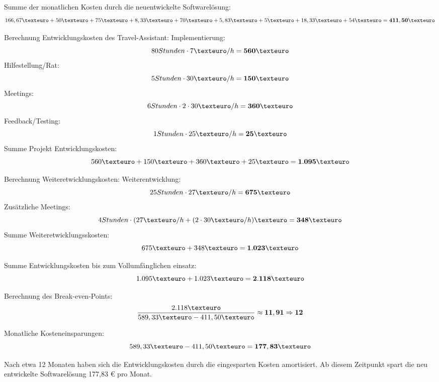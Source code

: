 Summe der monatlichen Kosten durch die neuentwickelte Softwarelösung: \[166,67€ + 50€ + 75€ + 8,33€ + 70€ + 5,83€ + 5€ + 18,33€ +54€ =  \bf{411,50€} \]

Berechnung Entwicklungskosten des Travel-Assistant:
	Implementierung: \[ 80 Stunden \cdot 7€/h =  \bf{560€} \]
	Hilfestellung/Rat: \[ 5 Stunden \cdot 30€/h =  \bf{150€} \]
	Meetings: \[ 6 Stunden \cdot 2 \cdot 30€/h =  \bf{360€} \]
	Feedback/Testing: \[ 1 Stunden \cdot 25€/h =  \bf{25€} \]
Summe Projekt Entwicklungskosten: \[560€ + 150€ + 360€ + 25€ =  \bf{1.095€} \]

Berechnung Weiteretwicklungskosten:
	Weiterentwicklung: \[ 25 Stunden \cdot 27€/h =  \bf{675€} \]
	Zusätzliche Meetings: \[ 4 Stunden \cdot ( 27€/h + ( 2 \cdot 30€/h)€ =  \bf{348€} \]
Summe Weiteretwicklungsskosten: \[675€ + 348€ =  \bf{1.023€} \]

Summe Entwicklungskosten bis zum Vollumfänglichen einsatz: \[1.095€ + 1.023€ =  \bf{2.118€} \]

Berechnung des Break-even-Points: \[ \displaystyle\frac{2.118€}{589,33€ - 411,50€} \approx  \bf{11,91} \Rightarrow 12 \] 

Monatliche Kosteneinsparungen:
\[ 589,33€ - 411,50€ =  \bf{177,83€} \]

Nach etwa 12 Monaten haben sich die Entwicklungskosten durch die eingesparten Kosten amortisiert. Ab diesem Zeitpunkt spart die neu entwickelte Softwarelösung 177,83 € pro Monat.